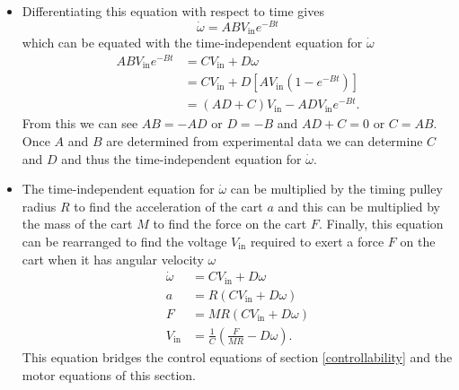 \documentclass{article}
\begin{document}
\begin{itemize}
  \item Differentiating this equation with respect to time gives \[\dot{\omega} = A B V_\text{in} e^{-B t}\] which can be equated with the time-independent equation for $\dot{\omega}$ \begin{align*}
          A B V_\text{in} e^{-B t} & = C V_\text{in} + D \omega                          \\
                                   & = C V_\text{in} + D [A V_\text{in} (1 - e^{-B t})]  \\
                                   & = (A D + C) V_\text{in} - A D V_\text{in} e^{-B t}.
        \end{align*} From this we can see $A B = -A D$ or $D = - B$ and $A D + C = 0$ or $C = A B$. Once $A$ and $B$ are determined from experimental data we can determine $C$ and $D$ and thus the time-independent equation for $\dot{\omega}$.

  \item The time-independent equation for $\dot{\omega}$ can be multiplied by the timing pulley radius $R$ to find the acceleration of the cart $a$ and this can be multiplied by the mass of the cart $M$ to find the force on the cart $F$. Finally, this equation can be rearranged to find the voltage $V_\text{in}$ required to exert a force $F$ on the cart when it has angular velocity $\omega$ \begin{align*}
          \dot{\omega} & = C V_\text{in} + D \omega                             \\
          a            & = R (C V_\text{in} + D \omega)                         \\
          F            & = M R (C V_\text{in} + D \omega)                       \\
          V_\text{in}  & = \frac{1}{C} \left( \frac{F}{M R} - D \omega \right).
        \end{align*} This equation bridges the control equations of section \ref{controllability} and the motor equations of this section.
\end{itemize}
\end{document}
